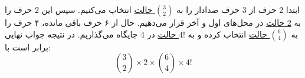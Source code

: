 \p
    ابتدا 2 حرف از 3 حرف صدادار را به 
    \underline{${3\choose 2}$ حالت}
    انتخاب می‌کنیم. سپس این 2 حرف را به 
    \underline{2 حالت}
     در محل‌های اول و آخر قرار می‌دهیم.
    حال از ۶ حرف باقی مانده، ۴ حرف را به 
    \underline{${6\choose 4}$ حالت}
    انتخاب کرده و به 
    \underline{$4!$ حالت}
    در 4 جایگاه می‌گذاریم.
    در نتیجه جواب نهایی برابر است با:
    $${3\choose 2} \times 2 \times {6\choose 4} \times 4!$$
    
